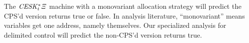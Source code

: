 {\begin{small}
\begin{SCodeFlow}
\begin{RktBlk}
\begin{SingleColumn}
\mbox{}\RktPn{(}\mbox{}\mbox{}\RktPn{(}\RktSym{$\lambda$}\mbox{}\RktPn{(}\RktPn{)}\mbox{}\RktPn{(}\mbox{}\mbox{}\RktPn{(}\RktSym{$\lambda$}\mbox{}\RktPn{(}\RktPn{)}\mbox{}\RktPn{(}\RktSym{$\le$}\mbox{}\mbox{}\RktPn{)}\RktPn{)}\RktPn{)}\RktPn{)}\RktPn{)}\RktPn{)}\end{SingleColumn}\end{RktBlk}\end{SCodeFlow}
\end{small}
The $\mathit{CESK^*_t\Xi}$ machine with a monovariant allocation strategy will predict the CPS'd version returns true or false.
%
In analysis literature, ``monovariant'' means variables get one address, namely themselves.
%
Our specialized analysis for delimited control will predict the non-CPS'd version returns true.}

